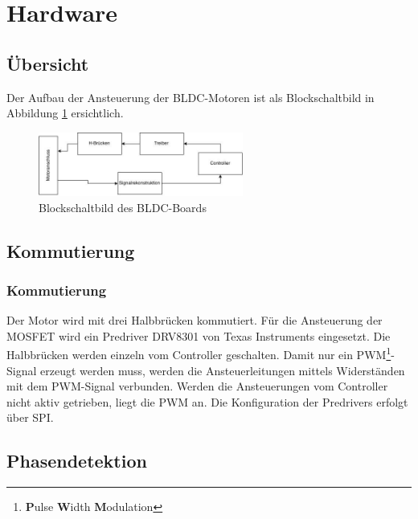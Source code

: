 \ifSTANDALONE
\section{Hardware}
\fi

\subsection{Übersicht}
Der Aufbau der Ansteuerung der BLDC-Motoren ist als Blockschaltbild in Abbildung 
\ref{abb:BlockschaltbildBLDC} ersichtlich.
\begin{figure}[h!]
   	\includegraphics[width=0.6\textwidth,clip,trim=0mm 0mm 0mm 0mm]
   	{Enddokumentation/ET-Gruppe/Bilder/Blockschaltbild_BLDC.jpg}
   	\centering
   	\caption{Blockschaltbild des BLDC-Boards}
   	\label{abb:BlockschaltbildBLDC}
\end{figure}

\ifSTANDALONE
\subsection{Kommutierung}
\fi
\ifEMBED
\subsubsection{Kommutierung}
\fi
Der Motor wird mit drei Halbbrücken kommutiert. Für die Ansteuerung der MOSFET 
wird ein Predriver DRV8301 von Texas Instruments eingesetzt. Die Halbbrücken 
werden einzeln vom Controller geschalten. Damit nur ein 
PWM\footnote{\textbf{P}ulse \textbf{W}idth \textbf{M}odulation}-Signal erzeugt 
werden muss, werden die Ansteuerleitungen mittels Widerständen mit dem 
PWM-Signal verbunden. Werden die Ansteuerungen vom Controller nicht aktiv 
getrieben, liegt die PWM an. Die Konfiguration der Predrivers erfolgt über SPI. 

\ifSTANDALONE
\subsection{Phasendetektion}
\fi
\ifEMBED
